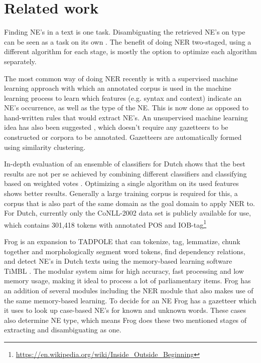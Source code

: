 \section{Related work} \label{sec:rel}
Finding NE's in a text is one task. Disambiguating the retrieved NE's on type can be seen as a task on its own \cite{buitinck2012two}. The benefit of doing NER two-staged, using a different algorithm for each stage, is mostly the option to optimize each algorithm separately.  

The most common way of doing NER recently is with a supervised machine learning approach with which an annotated corpus is used in the machine learning process to learn which features (e.g. syntax and context) indicate an NE's occurrence, as well as the type of the NE. This is now done as opposed to hand-written rules that would extract NE's. An unsupervised machine learning idea has also been suggested \cite{kazama2008inducing}, which doesn't require any gazetteers to be constructed or corpora to be annotated. Gazetteers are automatically formed using similarity clustering.

In-depth evaluation of an ensemble of classifiers for Dutch shows that the best results are not per se achieved by combining different classifiers and classifying based on weighted votes \cite{desmet2014fine}. Optimizing a single algorithm on its used features shows better results. Generally a large training corpus is required for this, a corpus that is also part of the same domain as the goal domain to apply NER to. For Dutch, currently only the CoNLL-2002 data set is publicly available for use, which contains 301,418 tokens with annotated POS and IOB-tag\footnote{\url{https://en.wikipedia.org/wiki/Inside_Outside_Beginning}}

Frog is an expansion to TADPOLE \cite{bosch2007efficient} that can tokenize, tag, lemmatize, chunk together and morphologically segment word tokens, find dependency relations, and detect NE's in Dutch texts using the memory-based learning software TiMBL \cite{daelemans2004timbl}. The modular system aims for high accuracy, fast processing and low memory usage, making it ideal to process a lot of parliamentary items. Frog has an addition of several modules including the NER module that also makes use of the same memory-based learning. To decide for an NE Frog has a gazetteer which it uses to look up case-based NE's for known and unknown words. These cases also determine NE type, which means Frog does these two mentioned stages of extracting and disambiguating as one.




